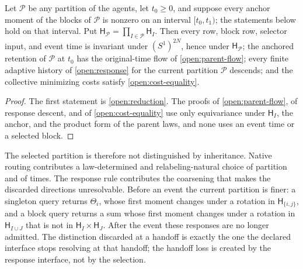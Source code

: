 Let $\mathcal P$ be any partition of the agents, let $t_0\ge0$, and suppose every anchor moment of the blocks of $\mathcal P$ is nonzero on an interval $[t_0,t_1)$; the statements below hold on that interval. Put $\mathsf H_{\mathcal P}=\prod_{I\in\mathcal P}\mathsf H_I$. Then every row, block row, selector input, and event time is invariant under $(S^1)^{2N}$, hence under $\mathsf H_{\mathcal P}$; the anchored retention of $\mathcal P$ at $t_0$ has the original-time flow of \cref{open:parent-flow}; every finite adaptive history of \cref{open:response} for the current partition $\mathcal P$ descends; and the collective minimizing costs satisfy \cref{open:cost-equality}.
\begin{proof}
The first statement is \cref{open:reduction}. The proofs of \cref{open:parent-flow}, of response descent, and of \cref{open:cost-equality} use only equivariance under $\mathsf H_I$, the anchor, and the product form of the parent laws, and none uses an event time or a selected block.
\end{proof}

The selected partition is therefore not distinguished by inheritance. Native routing contributes a law-determined and relabeling-natural choice of partition and of times. The response rule contributes the coarsening that makes the discarded directions unresolvable. Before an event the current partition is finer: a singleton query returns $\Theta_i$, whose first moment changes under a rotation in $\mathsf H_{\{i,j\}}$, and a block query returns a sum whose first moment changes under a rotation in $\mathsf H_{I\cup J}$ that is not in $\mathsf H_I\times\mathsf H_J$. After the event these responses are no longer admitted. The distinction discarded at a handoff is exactly the one the declared interface stops resolving at that handoff; the handoff loss is created by the response interface, not by the selection.

